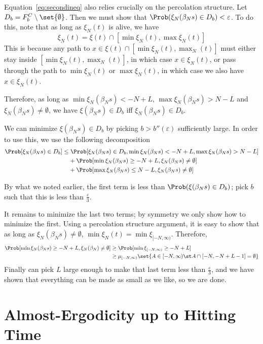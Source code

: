 \documentclass{scrartcl}
\newcommand{\ep}{\varepsilon}
\begin{document}
Equation~\ref{eq:secondineq} also relies crucially on the percolation structure. Let $D_{b} = F_{b}^{C} \setminus \set{\emptyset}$. Then we must show that $\Prob(\xi_{N}(\beta_{N}s) \in D_{b}) < \ep$. To do this, note that as long as $\xi_{N}(t)$ is alive, we have
\[ \xi_{N}(t) = \xi(t) \cap [\min \xi_{N}(t), \max \xi_{N}(t)] \]
This is because any path to $x \in \xi(t) \cap [\min \xi_{N}(t), \max_{N}(t)]$ must either stay inside $[\min \xi_{N}(t), \max_{N}(t)]$, in which case $x \in \xi_{N}(t)$, or pass through the path to $\min \xi_{N}(t)$ or $\max \xi_{N}(t)$, in which case we also have $x \in \xi_{N}(t)$.

Therefore, as long as $\min \xi_{N}(\beta_{N}s) < -N + L$, $\max \xi_{N}(\beta_{N}s) > N - L$ and $\xi_{N}(\beta_{N}s) \neq \emptyset$, we have $\xi(\beta_{N}s) \in D_{b}$ iff $\xi_{N}(\beta_{N}s) \in D_{b}$.

We can minimize $\xi(\beta_{N}s) \in D_{b}$ by picking $b > b''(\ep)$ sufficiently large. In order to use this, we use the following decomposition
\begin{align*}
  \Prob[\xi_{N}(\beta_{N}s) \in D_{b}] \leq&\; \Prob[\xi_{N}(\beta_{N}s) \in D_{b}, \min \xi_{N}(\beta_{N}s) < -N + L, \max \xi_{N}(\beta_{N}s) > N - L] \\
                                &+ \Prob[\min \xi_{N}(\beta_{N}s) \geq -N + L, \xi_{N}(\beta_{N}s) \neq \emptyset] \\
                                &+ \Prob[\max \xi_{N}(\beta_{N}s) \leq N - L, \xi_{N}(\beta_{N}s) \neq \emptyset]
\end{align*}

By what we noted earlier, the first term is less than $\Prob(\xi(\beta_{N}s) \in D_{b})$; pick $b$ such that this is less than $\frac{\ep}{3}$.

It remains to minimize the last two terms; by symmetry we only show how to minimize the first. Using a percolation structure argument, it is easy to show that as long as $\xi_{N}(\beta_{N}s) \neq \emptyset$, $\min \xi_{N}(t) = \min \xi_{[-N,\infty)}$. Therefore,
\begin{align*}
  \Prob[\min \xi_{N}(\beta_{N}s) \geq -N + L, \xi_{N}(\beta_{N}) \neq \emptyset] &\geq \Prob[\min \xi_{[-N,\infty)} \geq -N+L] \\
  &\geq \mu_{[-N,\infty)}\set{A \in [-N,\infty) \st A \cap [-N,-N+L-1] = \emptyset}
\end{align*}
Finally can pick $L$ large enough to make that last term less than $\frac{\ep}{3}$, and we have shown that everything can be made as small as we like, so we are done.

\section{Almost-Ergodicity up to Hitting Time}
\end{document}

